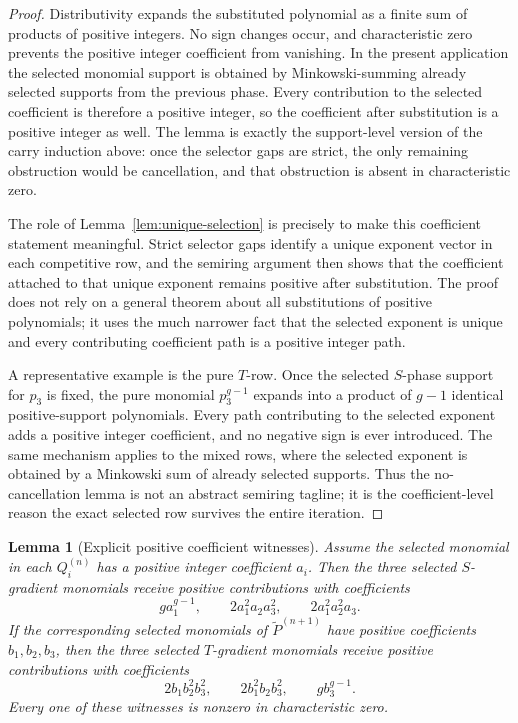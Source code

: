 \documentclass[11pt]{article}
\newtheorem{lemma}[theorem]{Lemma}
\theoremstyle{remark}
\numberwithin{equation}{section}
\begin{document}
\begin{proof}
Distributivity expands the substituted polynomial as a finite sum of products
of positive integers.  No sign changes occur, and characteristic zero prevents
the positive integer coefficient from vanishing.  In the present application
the selected monomial support is obtained by Minkowski-summing already selected
supports from the previous phase.  Every contribution to the selected
coefficient is therefore a positive integer, so the coefficient after
substitution is a positive integer as well.  The lemma is exactly the
support-level version of the carry induction above: once the selector gaps are
strict, the only remaining obstruction would be cancellation, and that
obstruction is absent in characteristic zero.
\par
The role of Lemma~\ref{lem:unique-selection} is precisely to make this
coefficient statement meaningful.  Strict selector gaps identify a unique
exponent vector in each competitive row, and the semiring argument then shows
that the coefficient attached to that unique exponent remains positive after
substitution.  The proof does not rely on a general theorem about all
substitutions of positive polynomials; it uses the much narrower fact that the
selected exponent is unique and every contributing coefficient path is a
positive integer path.
\par
A representative example is the pure \(T\)-row.  Once the selected \(S\)-phase
support for \(p_3\) is fixed, the pure monomial \(p_3^{g-1}\) expands into a
product of \(g-1\) identical positive-support polynomials.  Every path
contributing to the selected exponent adds a positive integer coefficient, and
no negative sign is ever introduced.  The same mechanism applies to the mixed
rows, where the selected exponent is obtained by a Minkowski sum of already
selected supports.  Thus the no-cancellation lemma is not an abstract semiring
tagline; it is the coefficient-level reason the exact selected row survives the
entire iteration.
\end{proof}

\begin{lemma}[Explicit positive coefficient witnesses]\label{lem:coefficient-witness}
Assume the selected monomial in each \(Q_i^{(n)}\) has a positive integer
coefficient \(a_i\).  Then the three selected \(S\)-gradient monomials receive
positive contributions with coefficients
\[
g a_1^{g-1},
\qquad
2a_1^2a_2a_3^2,
\qquad
2a_1^2a_2^2a_3.
\]
If the corresponding selected monomials of
\(\widetilde P^{(n+1)}\) have positive coefficients \(b_1,b_2,b_3\), then
the three selected \(T\)-gradient monomials receive positive contributions
with coefficients
\[
2b_1b_2^2b_3^2,
\qquad
2b_1^2b_2b_3^2,
\qquad
g b_3^{g-1}.
\]
Every one of these witnesses is nonzero in characteristic zero.
\end{lemma}
\end{document}
